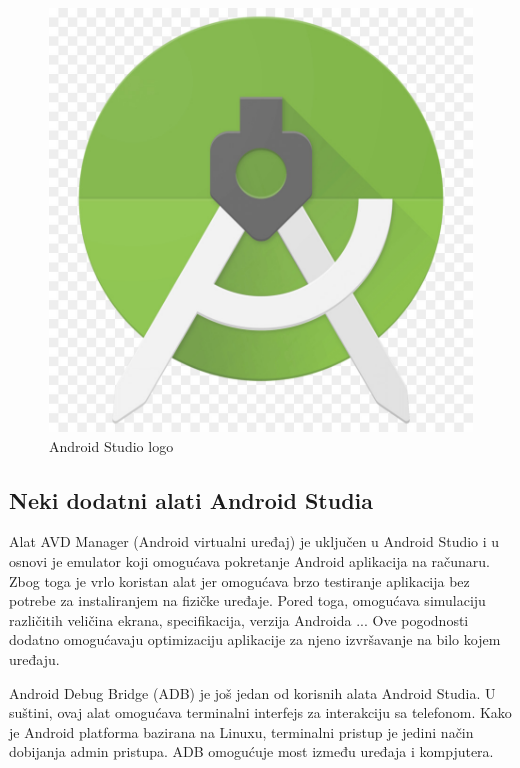 \documentclass[12pt]{article}
\begin{document}
\begin{figure}[ht!]
    \centering
    \includegraphics[scale=0.05]{android_studio_logo.jpg}
    \caption{Android Studio logo}
\end{figure}
\subsection{Neki dodatni alati Android Studia}
Alat AVD Manager (Android virtualni uređaj) je uključen u Android Studio i u osnovi je emulator koji omogućava pokretanje Android aplikacija na računaru. Zbog toga je vrlo koristan alat jer omogućava brzo testiranje aplikacija bez potrebe za instaliranjem na fizičke uređaje. Pored toga, omogućava simulaciju različitih veličina ekrana, specifikacija, verzija Androida ... Ove pogodnosti dodatno omogućavaju optimizaciju aplikacije za njeno izvršavanje na bilo kojem uređaju.

Android Debug Bridge (ADB) je još jedan od korisnih alata Android Studia. U suštini, ovaj alat omogućava terminalni interfejs za interakciju sa telefonom. Kako je Android platforma bazirana na Linuxu, terminalni pristup je jedini način dobijanja admin pristupa. ADB omogućuje most između uređaja i kompjutera.
\end{document}
